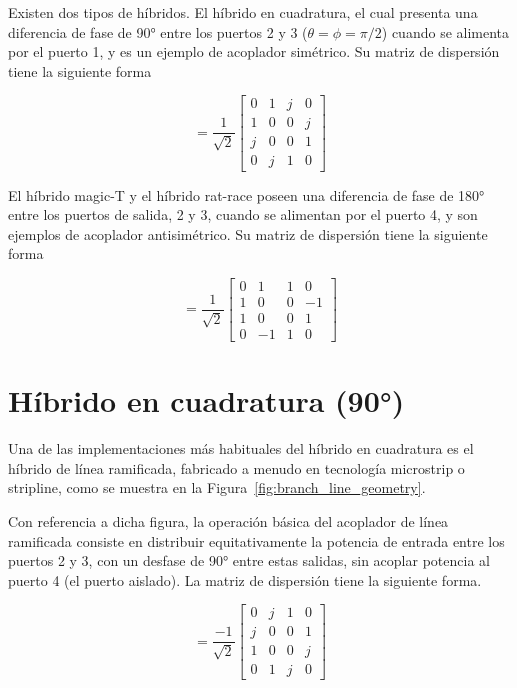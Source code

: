 Existen dos tipos de híbridos. El híbrido en cuadratura, el cual presenta una diferencia de fase de 90° entre los puertos 2 y 3 ($\theta = \phi = \pi/2$) cuando se alimenta por el puerto 1, y es un ejemplo de acoplador simétrico. Su matriz de dispersión tiene la siguiente forma

\begin{equation}
    [S] = \frac{1}{\sqrt{2}} 
    \begin{bmatrix} 
        0 & 1 & j & 0 \\ 
        1 & 0 & 0 & j \\ 
        j & 0 & 0 & 1 \\ 
        0 & j & 1 & 0 
    \end{bmatrix}
    \label{eq:quadrature_hybrid}
\end{equation}

El híbrido magic-T y el híbrido rat-race poseen una diferencia de fase de 180° entre los puertos de salida, 2 y 3, cuando se alimentan por el puerto 4, y son ejemplos de acoplador antisimétrico. Su matriz de dispersión tiene la siguiente forma

\begin{equation}
    [S] = \frac{1}{\sqrt{2}} 
    \begin{bmatrix} 
        0 & 1  & 1 & 0  \\ 
        1 & 0  & 0 & -1 \\ 
        1 & 0  & 0 & 1  \\ 
        0 & -1 & 1 & 0 
    \end{bmatrix}
    \label{eq:antisymmetric_hybrid}
\end{equation}

\section{Híbrido en cuadratura (90°)}
Una de las implementaciones más habituales del híbrido en cuadratura es el híbrido de línea ramificada, fabricado a menudo en tecnología microstrip o stripline, como se muestra en la Figura~\ref{fig:branch_line_geometry}.

Con referencia a dicha figura, la operación básica del acoplador de línea ramificada consiste en distribuir equitativamente la potencia de entrada entre los puertos 2 y 3, con un desfase de 90° entre estas salidas, sin acoplar potencia al puerto 4 (el puerto aislado). La matriz de dispersión tiene la siguiente forma.

\begin{equation}
    [S] = \frac{-1}{\sqrt{2}} 
    \begin{bmatrix}
        0 & j & 1 & 0 \\
        j & 0 & 0 & 1 \\
        1 & 0 & 0 & j \\
        0 & 1 & j & 0
    \end{bmatrix}
    \label{eq:quadrature_scattering}
\end{equation}


